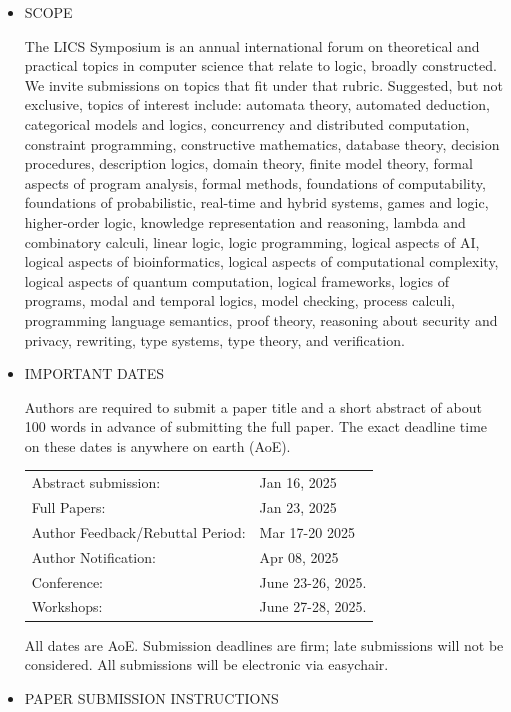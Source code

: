 \documentclass[prodmode,acmtecs]{acmsmall} %
\begin{document}
\begin{itemize}\item  SCOPE 
 
  The LICS Symposium is an annual international forum on theoretical and practical topics in computer science that relate to logic, broadly constructed. We invite submissions on topics that fit under that rubric. Suggested, but not exclusive, topics of interest include: automata theory, automated deduction, categorical models and logics, concurrency and distributed computation, constraint programming, constructive mathematics, database theory, decision procedures, description logics, domain theory, finite model theory, formal aspects of program analysis, formal methods, foundations of computability, foundations of probabilistic, real-time and hybrid systems, games and logic, higher-order logic, knowledge representation and reasoning, lambda and combinatory calculi, linear logic, logic programming, logical aspects of AI, logical aspects of bioinformatics, logical aspects of computational complexity, logical aspects of quantum computation, logical frameworks, logics of programs, modal and temporal logics, model checking, process calculi, programming language semantics, proof theory, reasoning about security and privacy, rewriting, type systems, type theory, and verification.  
 
\item  IMPORTANT DATES 
 
  Authors are required to submit a paper title and a short abstract of about 100 words in advance of submitting the full paper. The exact deadline time on these dates is anywhere on earth (AoE). 
 
\begin{tabulary}{\linewidth}{LL}Abstract submission:  & Jan 16, 2025 \\
Full Papers:  & Jan 23, 2025 \\
Author Feedback/Rebuttal Period:  & Mar 17-20 2025 \\
Author Notification:  & Apr 08, 2025 \\
Conference:  & June 23-26, 2025. \\
Workshops:  & June 27-28, 2025. \\
\end{tabulary}
 
  All dates are AoE. Submission deadlines are firm; late submissions will not be considered. All submissions will be electronic via easychair. 
 
\item  PAPER SUBMISSION INSTRUCTIONS 
 

\end{itemize}
\end{document}
